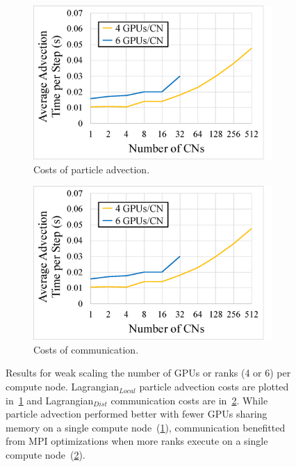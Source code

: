 \begin{figure}[!b]
\vspace{-4mm}
\begin{subfigure}{0.495\linewidth}
\centering
\includegraphics[width=\linewidth]{Images/advection_time2.eps}
\vspace{-3mm}
\caption{Costs of particle advection.}
\label{fig:advection}
\end{subfigure}
\begin{subfigure}{0.495\linewidth}
\centering
\includegraphics[width=\linewidth]{Images/communication_time2.eps}
\vspace{-3mm}
\caption{Costs of communication.}
\label{fig:communication}
\end{subfigure}
\caption{{Results for weak scaling the number of GPUs or ranks (4 or 6) per compute node. Lagrangian$_{Local}$ particle advection costs are plotted in~\ref{fig:advection} and Lagrangian$_{Dist}$ communication costs are in~\ref{fig:communication}. While particle advection performed better with fewer GPUs sharing memory on a single compute node~(\ref{fig:advection}), communication benefitted from MPI optimizations when more ranks execute on a single compute node~(\ref{fig:communication}).}} 
\label{fig:gpu_nodes}
\end{figure}
